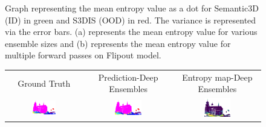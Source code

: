 \begin{figure}[!ht]
\begin{subfigure}{0.98\textwidth}
        \caption{}
        \label{fig:ent_flipout}
        \end{subfigure}
        \caption{Graph representing the mean entropy value as a dot for Semantic3D (ID) in green and S3DIS (OOD) in red. The variance is represented via the error bars.  (a) represents the mean entropy value for various ensemble sizes and (b) represents the mean entropy value for multiple forward passes on Flipout model.}
    \end{figure}
    \begin{figure}[h!]
        \begin{tabular}{ccc}
            Ground Truth & Prediction-Deep Ensembles & Entropy map-Deep Ensembles \\
            \includegraphics[width=0.33\textwidth, height=0.18\textheight]{images/seg_output/sem3d_seg_output/1_GT.pdf} &
            \includegraphics[width=0.33\textwidth, height=0.18\textheight]{images/seg_output/sem3d_seg_output/1_Pred.pdf}& 
            \includegraphics[width=0.33\textwidth, height=0.18\textheight]{images/seg_output/sem3d_seg_output/ent_de_1.pdf}\\


\end{tabular}
\end{figure}

